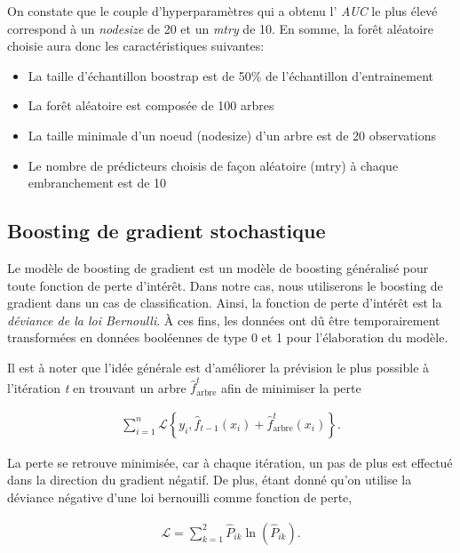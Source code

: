 \documentclass[]{article}
\begin{document}
On constate que le couple d'hyperparamètres qui a obtenu l' \emph{AUC}
le plus élevé correspond à un \emph{nodesize} de 20 et un \emph{mtry} de
10. En somme, la forêt aléatoire choisie aura donc les caractéristiques
suivantes:

\begin{itemize}
\item La taille d'échantillon boostrap est de 50\% de l'échantillon d'entrainement
\item La forêt aléatoire est composée de 100 arbres 
\item La taille minimale d'un noeud (nodesize) d'un arbre est de 20 observations
\item Le nombre de prédicteurs choisis de façon aléatoire (mtry) à chaque embranchement est de 10
\end{itemize}

\newpage

\subsection{Boosting de gradient
stochastique}\label{boosting-de-gradient-stochastique}

Le modèle de boosting de gradient est un modèle de boosting généralisé
pour toute fonction de perte d'intérêt. Dans notre cas, nous utiliserons
le boosting de gradient dans un cas de classification. Ainsi, la
fonction de perte d'intérêt est la \emph{déviance de la loi Bernoulli}.
À ces fins, les données ont dû être temporairement transformées en
données booléennes de type 0 et 1 pour l'élaboration du modèle.

Il est à noter que l'idée générale est d'améliorer la prévision le plus
possible à l'itération \emph{t} en trouvant un arbre
\(\widehat{f}_{\text{arbre}}^t\) afin de minimiser la perte

\begin{align}
   \sum_{i=1}^n \mathcal{L} \left\{ y_i, \widehat{f}_{t-1}(x_i) + \widehat{f}_{\text{arbre}}^t(x_i) \right\}.
\end{align}

La perte se retrouve minimisée, car à chaque itération, un pas de plus
est effectué dans la direction du gradient négatif. De plus, étant donné
qu'on utilise la déviance négative d'une loi bernouilli comme fonction
de perte,

\begin{align}
    \mathcal{L} = \sum_{k=1}^2 \widehat{P}_{ik} \ln( \widehat{P}_{ik}).
\end{align}
\end{document}
